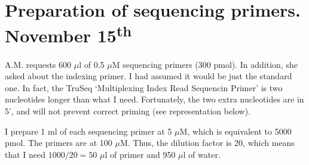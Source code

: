 \documentclass[a4paper,12pt]{article}
\begin{document}
\section{Preparation of sequencing primers. November 15\textsuperscript{th}}
A.M. requests 600 $\mu$l of 0.5 $\mu$M sequencing primers (300 pmol). In addition, she asked about the indexing primer. I had assumed it would be just the standard one. In fact, the TruSeq `Multiplexing Index Read Sequencin Primer' is two nucleotides longer than what I need. Fortunately, the two extra nucleotides are in 5', and will not prevent correct priming (see representation below).

I prepare 1 ml of each sequencing primer at 5 $\mu$M, which is equivalent to 5000 pmol. The primers are at 100 $\mu$M. Thus, the dilution factor is 20, which means that I need $1000/20=50$ $\mu$l of primer and 950 $\mu$l of water.
\end{document}

